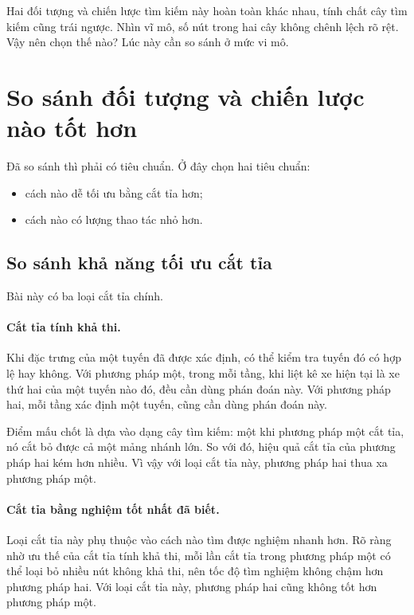 \documentclass[11pt]{article}
\begin{document}
Hai đối tượng và chiến lược tìm kiếm này hoàn toàn khác nhau, tính chất cây
tìm kiếm cũng trái ngược. Nhìn vĩ mô, số nút trong hai cây không chênh lệch
rõ rệt. Vậy nên chọn thế nào? Lúc này cần so sánh ở mức vi mô.

\section{So sánh đối tượng và chiến lược nào tốt hơn}

Đã so sánh thì phải có tiêu chuẩn. Ở đây chọn hai tiêu chuẩn:
\begin{itemize}
  \item cách nào dễ tối ưu bằng cắt tỉa hơn;
  \item cách nào có lượng thao tác nhỏ hơn.
\end{itemize}

\subsection{So sánh khả năng tối ưu cắt tỉa}

Bài này có ba loại cắt tỉa chính.

\paragraph{Cắt tỉa tính khả thi.}
Khi đặc trưng của một tuyến đã được xác định, có thể kiểm tra tuyến đó có hợp
lệ hay không. Với phương pháp một, trong mỗi tầng, khi liệt kê xe hiện tại là
xe thứ hai của một tuyến nào đó, đều cần dùng phán đoán này. Với phương pháp
hai, mỗi tầng xác định một tuyến, cũng cần dùng phán đoán này.

Điểm mấu chốt là dựa vào dạng cây tìm kiếm: một khi phương pháp một cắt tỉa,
nó cắt bỏ được cả một mảng nhánh lớn. So với đó, hiệu quả cắt tỉa của phương
pháp hai kém hơn nhiều. Vì vậy với loại cắt tỉa này, phương pháp hai thua xa
phương pháp một.

\paragraph{Cắt tỉa bằng nghiệm tốt nhất đã biết.}
Loại cắt tỉa này phụ thuộc vào cách nào tìm được nghiệm nhanh hơn. Rõ ràng
nhờ ưu thế của cắt tỉa tính khả thi, mỗi lần cắt tỉa trong phương pháp một có
thể loại bỏ nhiều nút không khả thi, nên tốc độ tìm nghiệm không chậm hơn
phương pháp hai. Với loại cắt tỉa này, phương pháp hai cũng không tốt hơn
phương pháp một.
\end{document}
